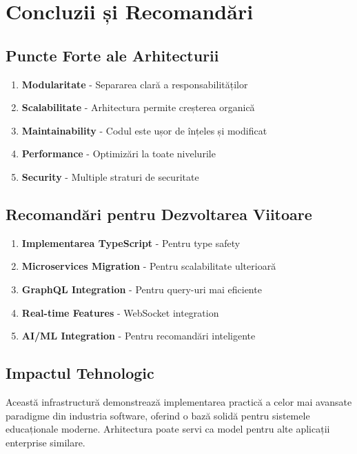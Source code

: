 \documentclass[11pt,a4paper]{article}
\begin{document}
\section{Concluzii și Recomandări}

\subsection{Puncte Forte ale Arhitecturii}

\begin{enumerate}
    \item \textbf{Modularitate} - Separarea clară a responsabilităților
    \item \textbf{Scalabilitate} - Arhitectura permite creșterea organică
    \item \textbf{Maintainability} - Codul este ușor de înțeles și modificat
    \item \textbf{Performance} - Optimizări la toate nivelurile
    \item \textbf{Security} - Multiple straturi de securitate
\end{enumerate}

\subsection{Recomandări pentru Dezvoltarea Viitoare}

\begin{enumerate}
    \item \textbf{Implementarea TypeScript} - Pentru type safety
    \item \textbf{Microservices Migration} - Pentru scalabilitate ulterioară
    \item \textbf{GraphQL Integration} - Pentru query-uri mai eficiente
    \item \textbf{Real-time Features} - WebSocket integration
    \item \textbf{AI/ML Integration} - Pentru recomandări inteligente
\end{enumerate}

\subsection{Impactul Tehnologic}

Această infrastructură demonstrează implementarea practică a celor mai avansate paradigme din industria software, oferind o bază solidă pentru sistemele educaționale moderne. Arhitectura poate servi ca model pentru alte aplicații enterprise similare.
\end{document}
